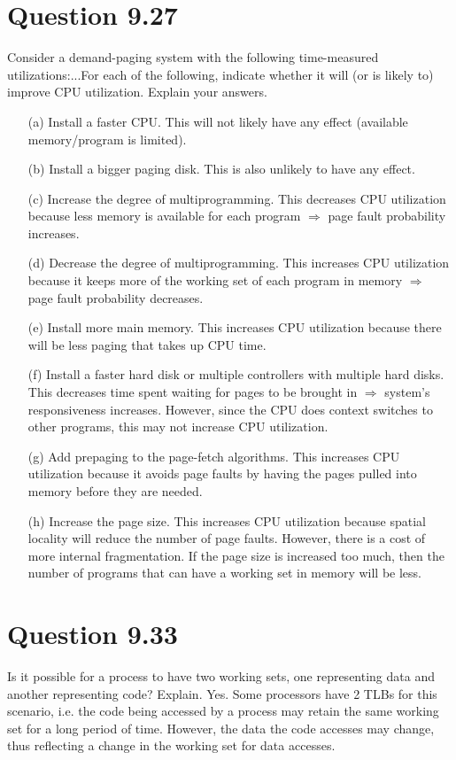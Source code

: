 \documentclass[12pt]{article}
\begin{document}
\section*{Question 9.27}{\color{blue}Consider a demand-paging system with the following time-measured utilizations:...For each of the following, indicate whether it will (or is likely to) improve CPU utilization. Explain your answers.
\begin{enumerate}
\item[(a)]Install a faster CPU. {\color{black}This will not likely have any effect (available memory/program is limited). 
}
\item[(b)]Install a bigger paging disk. {\color{black}This is also unlikely to have any effect.
}
\item[(c)]Increase the degree of multiprogramming. {\color{black}This decreases CPU utilization because less memory is available for each program $\Rightarrow$ page fault probability increases.
}
\item[(d)]Decrease the degree of multiprogramming. {\color{black}This increases CPU utilization because it keeps more of the working set of each program in memory $\Rightarrow$ page fault probability decreases.
}
\item[(e)]Install more main memory. {\color{black}This increases CPU utilization because there will be less paging that takes up CPU time.
}
\item[(f)]Install a faster hard disk or multiple controllers with multiple hard disks. {\color{black}This decreases time spent waiting for pages to be brought in $\Rightarrow$ system's responsiveness increases. However, since the CPU does context switches to other programs, this may not increase CPU utilization.
}
\item[(g)]Add prepaging to the page-fetch algorithms. {\color{black}This increases CPU utilization because it avoids page faults by having the pages pulled into memory before they are needed.
}
\item[(h)]Increase the page size. {\color{black}This increases CPU utilization because spatial locality will reduce the number of page faults. However, there is a cost of more internal fragmentation. If the page size is increased too much, then the number of programs that can have a working set in memory will be less.
}
\end{enumerate}

}

\section*{Question 9.33}{\color{blue}Is it possible for a process to have two working sets, one representing data and another representing code? Explain.} Yes. Some processors have 2 TLBs for this scenario, i.e. the code being accessed by a process may retain the same working set for a long period of time. However, the data the code accesses may change, thus reflecting a change in the working set for data accesses.
\end{document}

